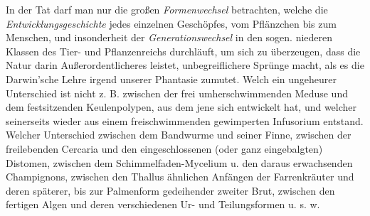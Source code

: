 \documentclass[a4paper, 11pt, oneside, english]{article}
\begin{document}
In der Tat darf man nur die großen \emph{Formenwechsel} betrachten, welche die \emph{Entwicklungsgeschichte} jedes einzelnen Geschöpfes, vom Pflänzchen bis zum Menschen, und insonderheit der \emph{Generationswechsel} in den sogen. niederen Klassen des Tier- und Pflanzenreichs durchläuft, um sich zu überzeugen, dass die Natur darin Außerordentlicheres leistet, unbegreiflichere Sprünge macht, als es die Darwin'sche Lehre irgend unserer Phantasie zumutet. Welch ein ungeheurer Unterschied ist nicht z. B. zwischen der frei umherschwimmenden Meduse und dem festsitzenden Keulenpolypen, aus dem jene sich entwickelt hat, und welcher seinerseits wieder aus einem freischwimmenden gewimperten Infusorium entstand. Welcher Unterschied zwischen dem Bandwurme und seiner Finne, zwischen der freilebenden Cercaria und den eingeschlossenen (oder ganz eingebalgten) Distomen, zwischen dem Schimmelfaden-Mycelium u. den daraus erwachsenden Champignons, zwischen den Thallus ähnlichen Anfängen der Farrenkräuter und deren späterer, bis zur Palmenform gedeihender zweiter Brut, zwischen den fertigen Algen und deren verschiedenen Ur- und Teilungsformen u. s. w.
\end{document}
